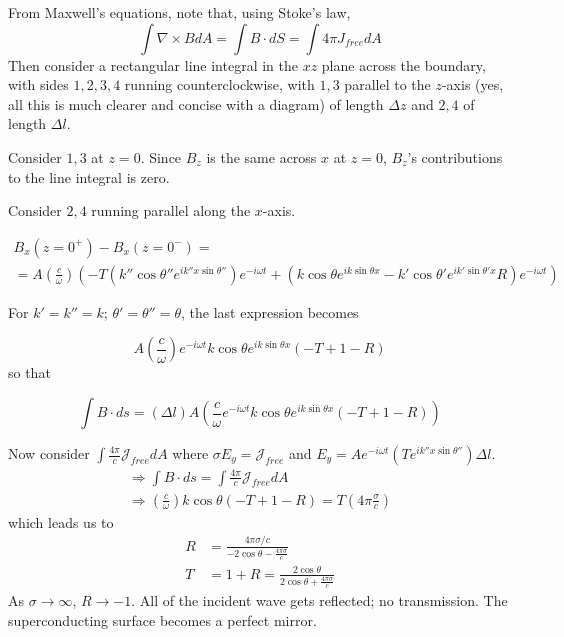 \documentclass[twoside,10pt]{amsart}
\begin{document}
From Maxwell's equations, note that, using Stoke's law,
\[
\int \nabla \times B dA = \int B \cdot dS = \int 4 \pi J_{free} dA
\]
Then consider a rectangular line integral in the $xz$ plane across the boundary, with sides $1,2,3,4$ running counterclockwise, with $1,3$ parallel to the $z$-axis (yes, all this is much clearer and concise with a diagram) of length $\Delta z$ and $2,4$ of length $\Delta l$.    

Consider $1,3$ at $z=0$.  Since $B_z$ is the same across $x$ at $z=0$, $B_z$'s contributions to the line integral is zero.  

Consider $2,4$ running parallel along the $x$-axis.  

\[
\begin{gathered}
  B_x(z=0^+) - B_x(z=0^-) = \\
  = A \left( \frac{c}{\omega } \right) ( -T (k''\cos{\theta''} e^{i k'' x \sin{\theta''} })e^{-i\omega t} + (k\cos{\theta} e^{ik\sin{\theta} x } - k'\cos{\theta'} e^{ i k'\sin{\theta'} x } R ) e^{-i \omega t} )
\end{gathered}
\]

For $k' = k'' = k$; $\theta' = \theta'' = \theta$, the last expression becomes

\[
A \left( \frac{c}{ \omega } \right) e^{-i \omega t} k \cos{\theta} e^{ i k\sin{\theta} x} ( -T + 1 -R) 
\]
so that

\[
\int B\cdot ds = (\Delta l ) A \left( \frac{c}{\omega } e^{-i\omega t} k\cos{\theta} e^{ik\sin{\theta} x } ( -T + 1 - R) \right)
\]

Now consider $\int \frac{ 4 \pi}{c} \mathcal{J}_{free} dA$ where $\sigma E_y = \mathcal{J}_{free}$ and $E_y = A e^{-i\omega t} (Te^{i k'' x \sin{\theta''} } ) \Delta l$.  
\[
\begin{gathered}
  \Longrightarrow \int B\cdot ds = \int \frac{4 \pi}{c} \mathcal{J}_{free} dA \\ 
  \Longrightarrow \left( \frac{c}{\omega } \right) k\cos{\theta} ( -T  +1 -R) = T ( 4 \pi \frac{ \sigma}{c} )  
\end{gathered}
\]
which leads us to
\[
\boxed{ \begin{aligned} R & = \frac{ 4 \pi \sigma /c}{ -2 \cos{\theta} - \frac{4 \pi \sigma}{c} } \\
    T & = 1 + R = \frac{ 2 \cos{\theta} }{ 2 \cos{\theta } + \frac{ 4 \pi \sigma}{c} } \end{aligned} }
\]
As $\sigma \to \infty$, $R \to - 1$.  All of the incident wave gets reflected; no transmission.  The superconducting surface becomes a perfect mirror.  
\end{document}
